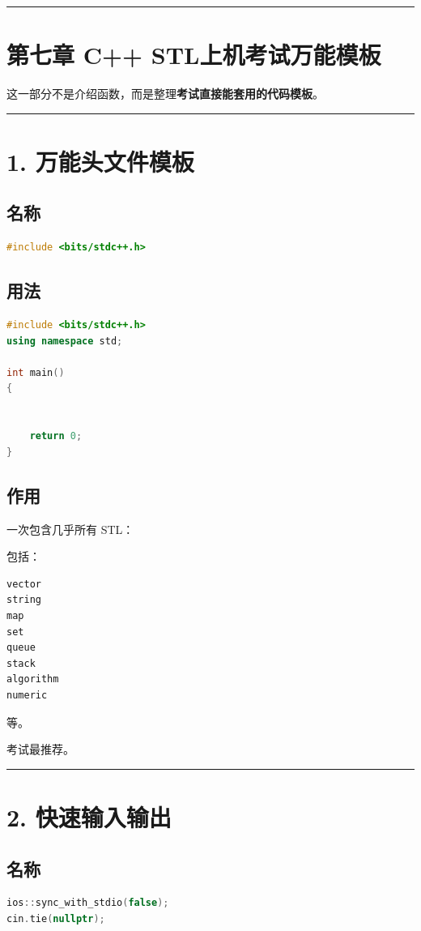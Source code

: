 \documentclass[9pt,twocolumn]{extarticle}
\begin{document}
\noindent\rule{\linewidth}{0.4pt}

\section{第七章 C++ STL上机考试万能模板}

这一部分不是介绍函数，而是整理\textbf{考试直接能套用的代码模板}。

\noindent\rule{\linewidth}{0.4pt}

\section{1. 万能头文件模板}

\subsection{名称}
\begin{lstlisting}[language=C++]
#include <bits/stdc++.h>
\end{lstlisting}

\subsection{用法}
\begin{lstlisting}[language=C++]
#include <bits/stdc++.h>
using namespace std;

int main()
{


    return 0;
}
\end{lstlisting}

\subsection{作用}
一次包含几乎所有 STL：

包括：
\begin{lstlisting}[language=C++]
vector
string
map
set
queue
stack
algorithm
numeric
\end{lstlisting}
等。

考试最推荐。

\noindent\rule{\linewidth}{0.4pt}

\section{2. 快速输入输出}

\subsection{名称}
\begin{lstlisting}[language=C++]
ios::sync_with_stdio(false);
cin.tie(nullptr);
\end{lstlisting}
\end{document}

